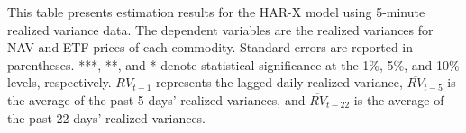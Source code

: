 \begin{landscape}
\begin{table}[htbp]
\begin{threeparttable}
\begin{tabular}{@{}lcccccccc@{}}
\bottomrule
\end{tabular}
\begin{tablenotes}
\small
\item This table presents estimation results for the HAR-X model using 5-minute realized variance data. The dependent variables are the realized variances for NAV and ETF prices of each commodity. Standard errors are reported in parentheses. ***, **, and * denote statistical significance at the 1\%, 5\%, and 10\% levels, respectively. $RV_{t-1}$ represents the lagged daily realized variance, $\overline{RV}_{t-5}$ is the average of the past 5 days' realized variances, and $\overline{RV}_{t-22}$ is the average of the past 22 days' realized variances.
\end{tablenotes}
\end{threeparttable}
\end{table}
\end{landscape}


